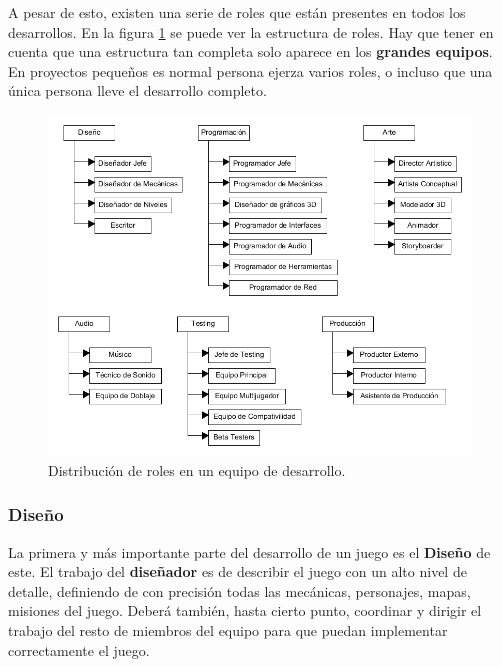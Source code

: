 A pesar de esto, existen una serie de roles que están presentes en todos los desarrollos. En la figura \ref{table-roles} se puede ver la estructura de roles. Hay que tener en cuenta que una estructura tan completa solo aparece en los \textbf{grandes equipos}. En proyectos pequeños es normal persona ejerza varios roles, o incluso que una única persona lleve el desarrollo completo.
\begin{figure}[!t]
    \centering
    \includegraphics[width=1\textwidth]{images/estadodelarte/desarrollo/table-roles}
    \caption{Distribución de roles en un equipo de desarrollo.}
    \label{table-roles}
\end{figure}

\subsubsection{Diseño}
La primera y más importante parte del desarrollo de un juego es el \textbf{Diseño} de este. El trabajo del \textbf{diseñador} es de describir el juego con un alto nivel de detalle, definiendo de con precisión todas las mecánicas, personajes, mapas, misiones del juego. Deberá también, hasta cierto punto, coordinar y dirigir el trabajo del resto de miembros del equipo para que puedan implementar correctamente el juego. 

